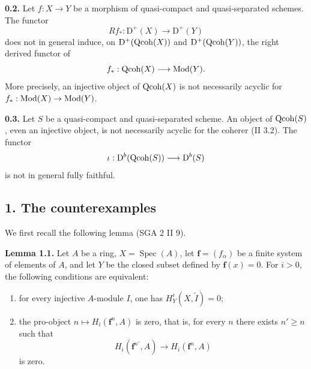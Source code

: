 \documentclass[11pt]{article}
\newcommand{\Spec}{\operatorname{Spec}}
\begin{document}
\textbf{0.2.} Let $f:X\to Y$ be a morphism of quasi-compact and quasi-separated schemes. The functor
\[
 Rf_*:\mathrm D^+(X)\longrightarrow\mathrm D^+(Y)
\]
does not in general induce, on $\mathrm D^+(\operatorname{Qcoh}(X))$ and $\mathrm D^+(\operatorname{Qcoh}(Y))$, the right derived functor of
\[
 f_*:\operatorname{Qcoh}(X)\longrightarrow\operatorname{Mod}(Y).
\]
More precisely, an injective object of $\operatorname{Qcoh}(X)$ is not necessarily acyclic for $f_*:\operatorname{Mod}(X)\to\operatorname{Mod}(Y)$.

\textbf{0.3.} Let $S$ be a quasi-compact and quasi-separated scheme. An object of $\operatorname{Qcoh}(S)$, even an injective object, is not necessarily acyclic for the coherer (II 3.2). The functor
\[
 \iota:\mathrm D^b(\operatorname{Qcoh}(S))\longrightarrow\mathrm D^b(S)
\]
is not in general fully faithful.

\subsection*{1. The counterexamples}
We first recall the following lemma (SGA 2 II 9).

\textbf{Lemma 1.1.} Let $A$ be a ring, $X=\Spec(A)$, let $\mathbf f=(f_\alpha)$ be a finite system of elements of $A$, and let $Y$ be the closed subset defined by $\mathbf f(x)=0$. For $i>0$, the following conditions are equivalent:
\begin{enumerate}[label=(\roman*)]
\item for every injective $A$-module $I$, one has $H^i_Y(X,\widetilde I)=0$;
\item the pro-object $n\mapsto H_i(\mathbf f^n,A)$ is zero, that is, for every $n$ there exists $n'\geq n$ such that
\[
 H_i(\mathbf f^{n'},A)\longrightarrow H_i(\mathbf f^n,A)
\]
is zero.
\end{enumerate}
\end{document}
